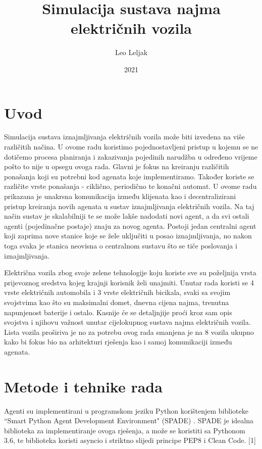 \documentclass{foi}
\title{Simulacija sustava najma električnih vozila}
\author{Leo Leljak}
\date{2021}
\begin{document}
\maketitle

\tableofcontents

\pagestyle{plain}
\chapter{Uvod}

Simulacija sustava iznajmljivanja električnih vozila može biti izvedena na više različitih načina. U ovome radu koristimo pojednostavljeni pristup u kojemu se ne dotičemo procesa planiranja i zakazivanja pojedinih narudžba u određeno vrijeme pošto to nije u opsegu ovoga rada. Glavni je fokus na kreiranju različitih ponašanja koji su potrebni kod agenata koje implementiramo. Također koriste se različite vrste ponašanja - ciklično, periodično te konačni automat. U ovome radu prikazana je unakrsna komunikacija između klijenata kao i decentralizirani pristup kreiranja novih agenata u sustav iznajmljivanja električnih vozila. Na taj način sustav je skalabilniji te se može lakše nadodati novi agent, a da svi ostali agenti (pojedinačne postaje) znaju za novog agenta. Postoji jedan centralni agent koji zaprima nove stanice koje se žele uključiti u posao iznajmljivanja, no nakon toga svaka je stanica neovisna o centralnom sustavu što se tiče poslovanja i iznajmljivanja. 

Električna vozila zbog svoje zelene tehnologije koju koriste sve su poželjnija vrsta prijevoznog sredstva kojeg krajnji korisnik želi unajmiti. Unutar rada koristi se 4 vrste električnih automobila i 3 vrste električnih bicikala, svaki sa svojim svojstvima kao što su maksimalni domet, dnevna cijena najma, trenutna napunjenost baterije i ostalo. Kasnije će se detaljnjije proći kroz sam opis svojstva i njihovu važnost unutar cijelokupnog sustava najma električnih vozila. Lista vozila proširiva je no za potrebu ovog rada smanjena je na 8 vozila ukupno kako bi fokus bio na arhitekturi rješenja kao i samoj komunikaciji između agenata.

\chapter{Metode i tehnike rada}

Agenti su implementirani u programskom jeziku Python korištenjem biblioteke “Smart Python Agent Development Environment" (SPADE) . SPADE je idealna biblioteka za implementiranje ovoga rješenja, a može se koristiti sa Pythonom 3.6, te biblioteka koristi asyncio i striktno slijedi principe PEP8 i Clean Code. [1]
\end{document}
